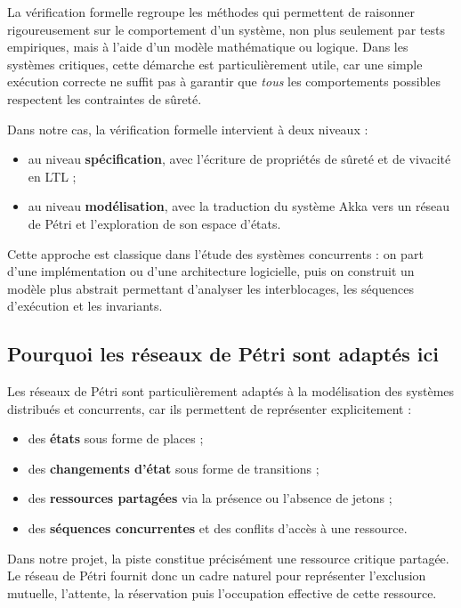 \documentclass[11pt,a4paper]{article}
\begin{document}
La vérification formelle regroupe les méthodes qui permettent de raisonner rigoureusement sur le comportement d'un système, non plus seulement par tests empiriques, mais à l'aide d'un modèle mathématique ou logique. Dans les systèmes critiques, cette démarche est particulièrement utile, car une simple exécution correcte ne suffit pas à garantir que \emph{tous} les comportements possibles respectent les contraintes de sûreté.

Dans notre cas, la vérification formelle intervient à deux niveaux :
\begin{itemize}
    \item au niveau \textbf{spécification}, avec l'écriture de propriétés de sûreté et de vivacité en LTL ;
    \item au niveau \textbf{modélisation}, avec la traduction du système Akka vers un réseau de Pétri et l'exploration de son espace d'états.
\end{itemize}

Cette approche est classique dans l'étude des systèmes concurrents : on part d'une implémentation ou d'une architecture logicielle, puis on construit un modèle plus abstrait permettant d'analyser les interblocages, les séquences d'exécution et les invariants.

\subsection{Pourquoi les réseaux de Pétri sont adaptés ici}

Les réseaux de Pétri sont particulièrement adaptés à la modélisation des systèmes distribués et concurrents, car ils permettent de représenter explicitement :
\begin{itemize}
    \item des \textbf{états} sous forme de places ;
    \item des \textbf{changements d'état} sous forme de transitions ;
    \item des \textbf{ressources partagées} via la présence ou l'absence de jetons ;
    \item des \textbf{séquences concurrentes} et des conflits d'accès à une ressource.
\end{itemize}

Dans notre projet, la piste constitue précisément une ressource critique partagée. Le réseau de Pétri fournit donc un cadre naturel pour représenter l'exclusion mutuelle, l'attente, la réservation puis l'occupation effective de cette ressource.
\end{document}
